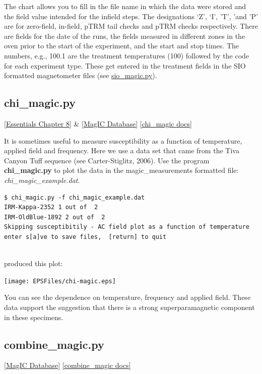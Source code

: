 \documentclass[11pt]{book}
\begin{document}
{{{\begin{verbatim}
\end{verbatim}

The chart allows you to fill in the file name in which the data were stored and the field value intended for the
infield steps.  The designations `Z', `I', 'T', 'and 'P'  are for zero-field, in-field, pTRM tail checks and pTRM checks respectively.  There are fields for the date of the runs, the fields measured in different zones in the oven prior to the start of the experiment, and the start and stop times.  The numbers, e.g., 100.1 are the treatment temperatures (100) followed by the code for each experiment type.  These get entered in the treatment fields in the SIO formatted magnetometer files (see \href{#SIO_magic}{sio\_magic.py}).



\subsection{chi\_magic.py}
\href{http://earthref.org/MAGIC/books/Tauxe/Essentials/WebBook3ch8.html#ch8}{[Essentials Chapter 8]} \& \href{#MagICDatabase}{[MagIC Database]}\label{ex:chi_magic}
\href{https://github.com/PmagPy/PmagPy/blob/master/programs/chi_magic.py}{[chi\_magic docs]}

It is sometimes useful to measure susceptibility as a function of temperature, applied field and frequency.   Here we use a data set that came from the Tiva Canyon Tuff sequence (see Carter-Stiglitz,  2006).  \nocite{carterstiglitz06}    Use the program {\bf chi\_magic.py} to plot the data in the magic\_measurements formatted file: {\it chi\_magic\_example.dat}.

\begin{verbatim}
$ chi_magic.py -f chi_magic_example.dat
IRM-Kappa-2352 1 out of  2
IRM-OldBlue-1892 2 out of  2
Skipping susceptibitily - AC field plot as a function of temperature
enter s[a]ve to save files,  [return] to quit


\end{verbatim}

\noindent produced this plot:


  \texttt{[image: EPSFiles/chi-magic.eps]}

You can see the dependence on temperature, frequency and applied field.  These data support the suggestion that there is a strong superparamagnetic component in these specimens.



\subsection {combine\_magic.py} \href{#MagICDatabase}{[MagIC Database]}
\label{ex:combine_magic}
\href{https://github.com/PmagPy/PmagPy/blob/master/programs/combine_magic.py}{[combine\_magic docs]}

}}}
\end{document}
